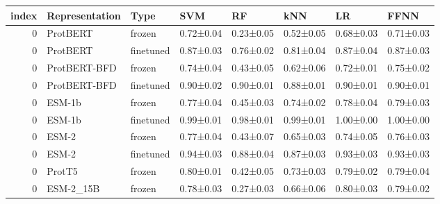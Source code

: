 \begin{tabular}{rlllllll}
\toprule
 index & Representation &      Type &       SVM &        RF &       kNN &        LR &      FFNN \\
\midrule
     0 &       ProtBERT &    frozen & 0.72±0.04 & 0.23±0.05 & 0.52±0.05 & 0.68±0.03 & 0.71±0.03 \\
     0 &       ProtBERT & finetuned & 0.87±0.03 & 0.76±0.02 & 0.81±0.04 & 0.87±0.04 & 0.87±0.03 \\
     0 &   ProtBERT-BFD &    frozen & 0.74±0.04 & 0.43±0.05 & 0.62±0.06 & 0.72±0.01 & 0.75±0.02 \\
     0 &   ProtBERT-BFD & finetuned & 0.90±0.02 & 0.90±0.01 & 0.88±0.01 & 0.90±0.01 & 0.90±0.01 \\
     0 &         ESM-1b &    frozen & 0.77±0.04 & 0.45±0.03 & 0.74±0.02 & 0.78±0.04 & 0.79±0.03 \\
     0 &         ESM-1b & finetuned & 0.99±0.01 & 0.98±0.01 & 0.99±0.01 & 1.00±0.00 & 1.00±0.00 \\
     0 &          ESM-2 &    frozen & 0.77±0.04 & 0.43±0.07 & 0.65±0.03 & 0.74±0.05 & 0.76±0.03 \\
     0 &          ESM-2 & finetuned & 0.94±0.03 & 0.88±0.04 & 0.87±0.03 & 0.93±0.03 & 0.93±0.03 \\
     0 &         ProtT5 &    frozen & 0.80±0.01 & 0.42±0.05 & 0.73±0.03 & 0.79±0.02 & 0.79±0.04 \\
     0 &      ESM-2_15B &    frozen & 0.78±0.03 & 0.27±0.03 & 0.66±0.06 & 0.80±0.03 & 0.79±0.02 \\
\bottomrule
\end{tabular}
